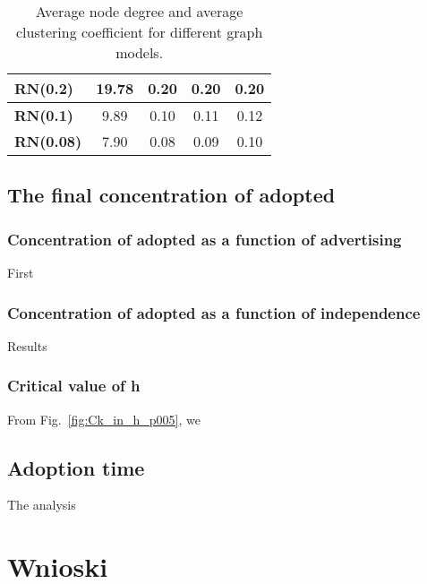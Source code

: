 \documentclass[a4paper,12pt,twoside]{report} %
\begin{document}
\begin{table}[H]
\begin{tabular}{|l|c|c|c|c|}
\textbf{RN(0.2)}       & 19.78                                                                  & 0.20                                                                   & 0.20                                                                       & 0.20                                                                       \\ \hline
\textbf{RN(0.1)}       & 9.89                                                                   & 0.10                                                                   & 0.11                                                                       & 0.12                                                                       \\ \hline
\textbf{RN(0.08)}      & 7.90                                                                   & 0.08                                                                   & 0.09                                                                       & 0.10                                                                       \\ \hline
\end{tabular}
\caption{Average node degree and average clustering coefficient for different graph models.}
\label{tab:graph_models_measures}
\end{table}


\section{The final concentration of adopted}
 

\subsection{Concentration of adopted as a function of advertising}
First

\subsection{Concentration of adopted as a function of independence}
Results 

\subsection{Critical value of h} 
\label{sec:critical_h}
From Fig.~\ref{fig:Ck_in_h_p005}, we 

\section{Adoption time} %
The analysis 

\chapter{Wnioski}




\nocite{*}

{\footnotesize}
\end{document}
